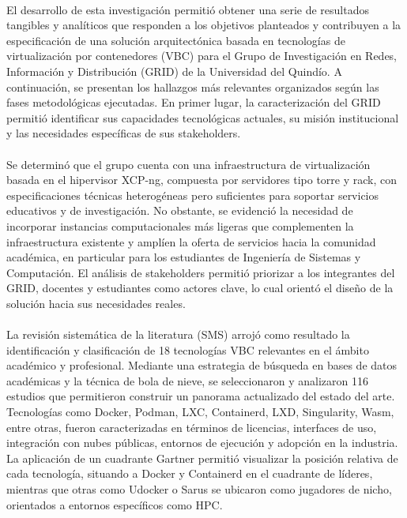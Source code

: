 \label{cap:resultados}
\mbox{}\\
El desarrollo de esta investigación permitió obtener una serie de resultados tangibles y analíticos que responden a los objetivos planteados y contribuyen a la especificación de una solución arquitectónica basada en tecnologías de virtualización por contenedores (VBC) para el Grupo de Investigación en Redes, Información y Distribución (GRID) de la Universidad del Quindío. A continuación, se presentan los hallazgos más relevantes organizados según las fases metodológicas ejecutadas. En primer lugar, la caracterización del GRID permitió identificar sus capacidades tecnológicas actuales, su misión institucional y las necesidades específicas de sus stakeholders.\\ \\
\noindent
Se determinó que el grupo cuenta con una infraestructura de virtualización basada en el hipervisor XCP-ng, compuesta por servidores tipo torre y rack, con especificaciones técnicas heterogéneas pero suficientes para soportar servicios educativos y de investigación. No obstante, se evidenció la necesidad de incorporar instancias computacionales más ligeras que complementen la infraestructura existente y amplíen la oferta de servicios hacia la comunidad académica, en particular para los estudiantes de Ingeniería de Sistemas y Computación. El análisis de stakeholders permitió priorizar a los integrantes del GRID, docentes y estudiantes como actores clave, lo cual orientó el diseño de la solución hacia sus necesidades reales.  \\ \\
\noindent
La revisión sistemática de la literatura (SMS) arrojó como resultado la identificación y clasificación de 18 tecnologías VBC relevantes en el ámbito académico y profesional. Mediante una estrategia de búsqueda en bases de datos académicas y la técnica de bola de nieve, se seleccionaron y analizaron 116 estudios que permitieron construir un panorama actualizado del estado del arte. Tecnologías como Docker, Podman, LXC, Containerd, LXD, Singularity, Wasm, entre otras, fueron caracterizadas en términos de licencias, interfaces de uso, integración con nubes públicas, entornos de ejecución y adopción en la industria. La aplicación de un cuadrante Gartner permitió visualizar la posición relativa de cada tecnología, situando a Docker y Containerd en el cuadrante de líderes, mientras que otras como Udocker o Sarus se ubicaron como jugadores de nicho, orientados a entornos específicos como HPC. \\ \\
